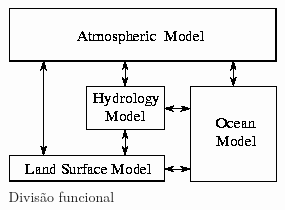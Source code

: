 \documentclass[xcolor={usenames,dvipsnames},12pt,presentation,aspectratio=169]{beamer}
\begin{document}
\begin{frame}
\begin{columns}
\begin{column}{0.6\textwidth}
\begin{center}
        \end{center}
     \end{column}
     \begin{column}{0.4\textwidth}
        \begin{center}
          \begin{figure}
        \includegraphics[width=0.8\textwidth]{functional.png}
            \caption{Divisão funcional}
          \end{figure}
        \end{center}
     \end{column}
   \end{columns}
\end{frame}
\end{document}
